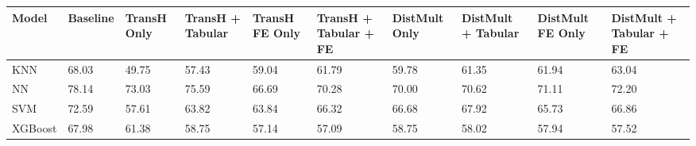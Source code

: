 \begin{tabular}{llllllllll}
\toprule
Model & Baseline & TransH Only & TransH + Tabular & TransH FE Only & TransH + Tabular + FE & DistMult Only & DistMult + Tabular & DistMult FE Only & DistMult + Tabular + FE \\
\midrule
KNN & 68.03 & 49.75 & 57.43 & 59.04 & 61.79 & 59.78 & 61.35 & 61.94 & 63.04 \\
NN & 78.14 & 73.03 & 75.59 & 66.69 & 70.28 & 70.00 & 70.62 & 71.11 & 72.20 \\
SVM & 72.59 & 57.61 & 63.82 & 63.84 & 66.32 & 66.68 & 67.92 & 65.73 & 66.86 \\
XGBoost & 67.98 & 61.38 & 58.75 & 57.14 & 57.09 & 58.75 & 58.02 & 57.94 & 57.52 \\
\bottomrule
\end{tabular}
